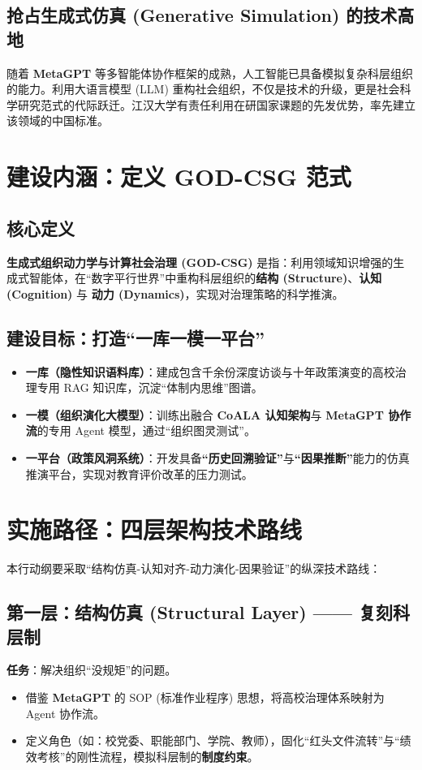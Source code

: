 \documentclass[12pt,a4paper,fontset=mac]{ctexart}
\begin{document}
\subsection{抢占生成式仿真 (Generative Simulation) 的技术高地}
随着 \textbf{MetaGPT} 等多智能体协作框架的成熟\cite{hong2023metagpt}，人工智能已具备模拟复杂科层组织的能力。利用大语言模型 (LLM) 重构社会组织，不仅是技术的升级，更是社会科学研究范式的代际跃迁\cite{epstein2006generative}。江汉大学有责任利用在研国家课题的先发优势，率先建立该领域的中国标准。

\section{建设内涵：定义 GOD-CSG 范式}

\subsection{核心定义}
\textbf{生成式组织动力学与计算社会治理 (GOD-CSG)} 是指：利用领域知识增强的生成式智能体，在“数字平行世界”中重构科层组织的\textbf{结构 (Structure)}、\textbf{认知 (Cognition)} 与 \textbf{动力 (Dynamics)}，实现对治理策略的科学推演。

\subsection{建设目标：打造“一库一模一平台”}
\begin{itemize}
    \item \textbf{一库（隐性知识语料库）}：建成包含千余份深度访谈与十年政策演变的高校治理专用 RAG 知识库，沉淀“体制内思维”图谱。
    \item \textbf{一模（组织演化大模型）}：训练出融合 \textbf{CoALA 认知架构}与 \textbf{MetaGPT 协作流}的专用 Agent 模型，通过“组织图灵测试”。
    \item \textbf{一平台（政策风洞系统）}：开发具备\textbf{“历史回溯验证”}与\textbf{“因果推断”}能力的仿真推演平台，实现对教育评价改革的压力测试。
\end{itemize}

\section{实施路径：四层架构技术路线}

本行动纲要采取“结构仿真-认知对齐-动力演化-因果验证”的纵深技术路线：

\subsection*{第一层：结构仿真 (Structural Layer) —— 复刻科层制}
\textbf{任务}：解决组织“没规矩”的问题。
\begin{itemize}
    \item 借鉴 \textbf{MetaGPT} \cite{hong2023metagpt} 的 SOP (标准作业程序) 思想，将高校治理体系映射为 Agent 协作流。
    \item 定义角色（如：校党委、职能部门、学院、教师），固化“红头文件流转”与“绩效考核”的刚性流程，模拟科层制的\textbf{制度约束}。
\end{itemize}
\end{document}
